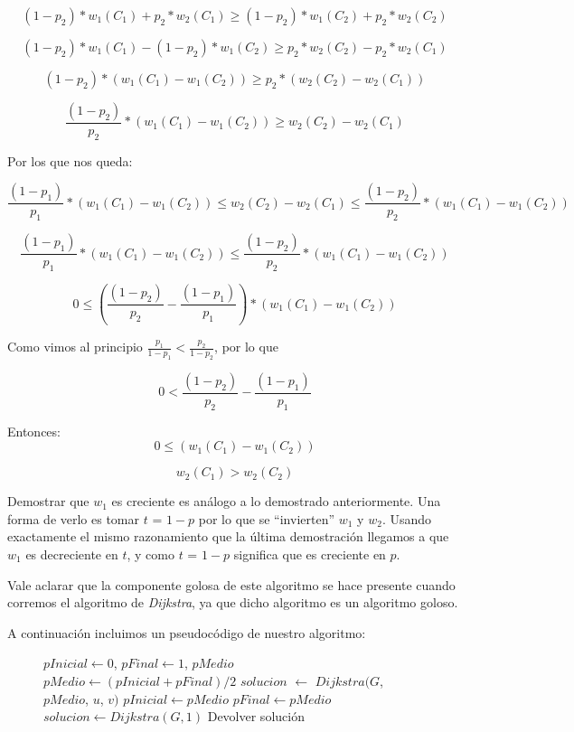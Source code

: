$$(1-p_2)*w_1(C_1) + p_2*w_2(C_1) \geq (1-p_2)*w_1(C_2) + p_2*w_2(C_2) $$

$$(1-p_2)*w_1(C_1) - (1-p_2)*w_1(C_2) \geq  p_2*w_2(C_2) - p_2*w_2(C_1) $$

$$(1-p_2)*(w_1(C_1) - w_1(C_2)) \geq  p_2*(w_2(C_2) - w_2(C_1)) $$

$$\frac{(1-p_2)}{p_2}*(w_1(C_1) - w_1(C_2)) \geq  w_2(C_2) - w_2(C_1) $$

Por los que nos queda:

$$\frac{(1-p_1)}{p_1}*(w_1(C_1) - w_1(C_2)) \leq  w_2(C_2) - w_2(C_1) \leq \frac{(1-p_2)}{p_2}*(w_1(C_1) - w_1(C_2))$$

$$\frac{(1-p_1)}{p_1}*(w_1(C_1) - w_1(C_2)) \leq \frac{(1-p_2)}{p_2}*(w_1(C_1) - w_1(C_2))$$

$$ 0 \leq (\frac{(1-p_2)}{p_2} - \frac{(1-p_1)}{p_1})*(w_1(C_1) - w_1(C_2))$$

Como vimos al principio $\frac{p_1}{1-p_1} < \frac{p_2}{1-p_2}$, por lo que 

$$0 < \frac{(1-p_2)}{p_2} - \frac{(1-p_1)}{p_1} $$

Entonces:
$$ 0 \leq (w_1(C_1) - w_1(C_2))$$

$$w_2(C_1) > w_2(C_2)$$

Demostrar que $w_1$ es creciente es análogo a lo demostrado anteriormente. Una forma de verlo es tomar $t$ = $1-p$ por lo que se ``invierten'' $w_1$ y $w_2$. Usando exactamente el mismo razonamiento que la última demostración llegamos a que $w_1$ es decreciente en $t$, y como $t$ = $1-p$ significa que es creciente en $p$.

Vale aclarar que la componente golosa de este algoritmo se hace presente cuando corremos el algoritmo de \emph{Dijkstra}, ya que dicho algoritmo es un algoritmo goloso.

A continuación incluimos un pseudocódigo de nuestro algoritmo:

\begin{center}
 \begin{figure}[H]
  \begin{pseudo}
    \State $pInicial \leftarrow 0$, $pFinal \leftarrow 1$, $pMedio$
      \State $pMedio \leftarrow (pInicial + pFinal)/2$
      \State $solucion$ $\leftarrow$ $Dijkstra(G$, $pMedio$, $u$, $v)$
	 \State $pInicial \leftarrow pMedio$
      \Else
	 \State $pFinal \leftarrow pMedio$
      \EndIf
    \EndFor
      \State $solucion \leftarrow Dijkstra(G, 1)$
    \EndIf
    \State Devolver solución
   \EndProcedure
  \end{pseudo}
 \end{figure}
\end{center}